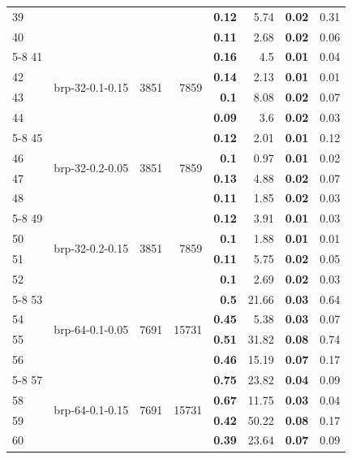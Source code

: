 \begin{longtable}{lrr@{\hskip 12pt}r@{\hskip 12pt}r@{\hskip 12pt}r@{\hskip 12pt}r@{\hskip 12pt}r}
39 &  &  &  & \textbf{0.12} & 5.74 & \textbf{0.02} & 0.31 \\
40 &  &  &  & \textbf{0.11} & 2.68 & \textbf{0.02} & 0.06 \\
\cmidrule{5-8}
41 & \multirow{4}{*}{brp-32-0.1-0.15} & \multirow{4}{*}{3851} & \multirow{4}{*}{7859} & \textbf{0.16} & 4.5 & \textbf{0.01} & 0.04 \\
42 &  &  &  & \textbf{0.14} & 2.13 & \textbf{0.01} & 0.01 \\
43 &  &  &  & \textbf{0.1} & 8.08 & \textbf{0.02} & 0.07 \\
44 &  &  &  & \textbf{0.09} & 3.6 & \textbf{0.02} & 0.03 \\
\cmidrule{5-8}
45 & \multirow{4}{*}{brp-32-0.2-0.05} & \multirow{4}{*}{3851} & \multirow{4}{*}{7859} & \textbf{0.12} & 2.01 & \textbf{0.01} & 0.12 \\
46 &  &  &  & \textbf{0.1} & 0.97 & \textbf{0.01} & 0.02 \\
47 &  &  &  & \textbf{0.13} & 4.88 & \textbf{0.02} & 0.07 \\
48 &  &  &  & \textbf{0.11} & 1.85 & \textbf{0.02} & 0.03 \\
\cmidrule{5-8}
49 & \multirow{4}{*}{brp-32-0.2-0.15} & \multirow{4}{*}{3851} & \multirow{4}{*}{7859} & \textbf{0.12} & 3.91 & \textbf{0.01} & 0.03 \\
50 &  &  &  & \textbf{0.1} & 1.88 & \textbf{0.01} & 0.01 \\
51 &  &  &  & \textbf{0.11} & 5.75 & \textbf{0.02} & 0.05 \\
52 &  &  &  & \textbf{0.1} & 2.69 & \textbf{0.02} & 0.03 \\
\cmidrule{5-8}
53 & \multirow{4}{*}{brp-64-0.1-0.05} & \multirow{4}{*}{7691} & \multirow{4}{*}{15731} & \textbf{0.5} & 21.66 & \textbf{0.03} & 0.64 \\
54 &  &  &  & \textbf{0.45} & 5.38 & \textbf{0.03} & 0.07 \\
55 &  &  &  & \textbf{0.51} & 31.82 & \textbf{0.08} & 0.74 \\
56 &  &  &  & \textbf{0.46} & 15.19 & \textbf{0.07} & 0.17 \\
\cmidrule{5-8}
57 & \multirow{4}{*}{brp-64-0.1-0.15} & \multirow{4}{*}{7691} & \multirow{4}{*}{15731} & \textbf{0.75} & 23.82 & \textbf{0.04} & 0.09 \\
58 &  &  &  & \textbf{0.67} & 11.75 & \textbf{0.03} & 0.04 \\
59 &  &  &  & \textbf{0.42} & 50.22 & \textbf{0.08} & 0.17 \\
60 &  &  &  & \textbf{0.39} & 23.64 & \textbf{0.07} & 0.09 \\

\end{longtable}
